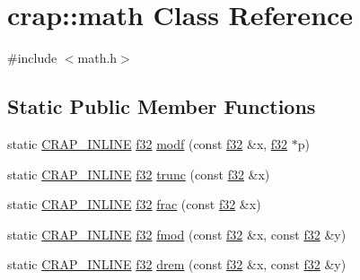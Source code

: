 \hypertarget{classcrap_1_1math}{\section{crap\-:\-:math Class Reference}
\label{classcrap_1_1math}
}


{\ttfamily \#include $<$math.\-h$>$}

\subsection*{Static Public Member Functions}
\begin{DoxyCompactItemize}
\item 
static \hyperlink{compilers_8h_a5a40526b8d842e7ff731509998bb0f1c}{C\-R\-A\-P\-\_\-\-I\-N\-L\-I\-N\-E} \hyperlink{types_8h_a154db6eda6a99565cb060a1da4b4c930}{f32} \hyperlink{classcrap_1_1math_a5055faf0d13c15d1eefaaa25a71ec783}{modf} (const \hyperlink{types_8h_a154db6eda6a99565cb060a1da4b4c930}{f32} \&x, \hyperlink{types_8h_a154db6eda6a99565cb060a1da4b4c930}{f32} $\ast$p)
\item 
static \hyperlink{compilers_8h_a5a40526b8d842e7ff731509998bb0f1c}{C\-R\-A\-P\-\_\-\-I\-N\-L\-I\-N\-E} \hyperlink{types_8h_a154db6eda6a99565cb060a1da4b4c930}{f32} \hyperlink{classcrap_1_1math_addea05390af4414d2b0eca120004b92d}{trunc} (const \hyperlink{types_8h_a154db6eda6a99565cb060a1da4b4c930}{f32} \&x)
\item 
static \hyperlink{compilers_8h_a5a40526b8d842e7ff731509998bb0f1c}{C\-R\-A\-P\-\_\-\-I\-N\-L\-I\-N\-E} \hyperlink{types_8h_a154db6eda6a99565cb060a1da4b4c930}{f32} \hyperlink{classcrap_1_1math_a5df2cde4c714d82fd372a083f36c7324}{frac} (const \hyperlink{types_8h_a154db6eda6a99565cb060a1da4b4c930}{f32} \&x)
\item 
static \hyperlink{compilers_8h_a5a40526b8d842e7ff731509998bb0f1c}{C\-R\-A\-P\-\_\-\-I\-N\-L\-I\-N\-E} \hyperlink{types_8h_a154db6eda6a99565cb060a1da4b4c930}{f32} \hyperlink{classcrap_1_1math_abd7ed0b391a065946d304acfbff17b3c}{fmod} (const \hyperlink{types_8h_a154db6eda6a99565cb060a1da4b4c930}{f32} \&x, const \hyperlink{types_8h_a154db6eda6a99565cb060a1da4b4c930}{f32} \&y)
\item 
static \hyperlink{compilers_8h_a5a40526b8d842e7ff731509998bb0f1c}{C\-R\-A\-P\-\_\-\-I\-N\-L\-I\-N\-E} \hyperlink{types_8h_a154db6eda6a99565cb060a1da4b4c930}{f32} \hyperlink{classcrap_1_1math_a78557527417d59dd3be3c27bb9cc041d}{drem} (const \hyperlink{types_8h_a154db6eda6a99565cb060a1da4b4c930}{f32} \&x, const \hyperlink{types_8h_a154db6eda6a99565cb060a1da4b4c930}{f32} \&y)

\end{DoxyCompactItemize}
